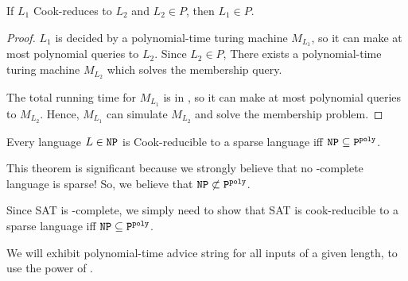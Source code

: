 \begin{lemma}
If $L_1$ Cook-reduces to $L_2$ and $L_2 \in P$, then $L_1 \in P$.
\end{lemma}
\begin{proof}
$L_1$ is decided by a  polynomial-time turing machine $M_{L_1}$,
so it can make at most polynomial queries to $L_2$. 
Since $L_2 \in P$, There exists a polynomial-time turing machine $M_{L_2}$
which solves the membership query.

The total running time for $M_{L_1}$ is in \ptime, so it can make at
most polynomial queries to $M_{L_2}$. Hence, $M_{L_1}$ can simulate
$M_{L_2}$ and solve the membership problem.
\end{proof}

\begin{theorem}
Every language $L \in \texttt{NP}$ is Cook-reducible to a sparse language
iff $\texttt{NP} \subseteq \text{$\texttt{P}^{\texttt{poly}}$}$.
\end{theorem}

This theorem is significant because we strongly believe that no \nptime-complete
language is sparse! So, we believe that $\texttt{NP} \not\subset \text{$\texttt{P}^{\texttt{poly}}$}$.

Since SAT is \nptime-complete, we simply need to show that SAT is cook-reducible
to a sparse language iff $\texttt{NP} \subseteq \text{$\texttt{P}^{\texttt{poly}}$}$.

We will exhibit polynomial-time advice string for all inputs of a
given length, to use the power of \ppoly.


